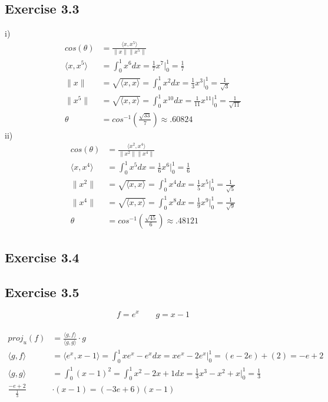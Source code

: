 \documentclass[letterpaper,12pt]{article}
\theoremstyle{definition}
\begin{document}
\subsection*{Exercise 3.3}
i)
\begin{align*}
cos(\theta)& = \frac{\langle x,x^{5}\rangle }{\|x\|\|x^{5}\|} \\
\langle x,x^{5}\rangle  &= \int^{1}_{0} x^{6} dx = \frac{1}{7}x^{7} |_{0}^{1} = \frac{1}{7} \\
\|x\| &= \sqrt{\langle x,x\rangle } = \int^{1}_{0} x^{2} dx = \frac{1}{3}x^{3} |_{0}^{1} = \frac{1}{\sqrt{3}} \\ 
\|x^{5}\| &= \sqrt{\langle x,x\rangle } = \int^{1}_{0} x^{10} dx = \frac{1}{11}x^{11} |_{0}^{1} = \frac{1}{\sqrt{11}} \\ 
\theta &= cos^{-1}(\frac{\sqrt{33}}{7}) \approx .60824
\end{align*}
ii)
\begin{align*}
cos(\theta)& = \frac{\langle x^{2},x^{4}\rangle }{\|x^{2}\|\|x^{4}\|} \\
\langle x,x^{4}\rangle  &= \int^{1}_{0} x^{5} dx = \frac{1}{6}x^{6} |_{0}^{1} = \frac{1}{6} \\
\|x^{2}\| &= \sqrt{\langle x,x\rangle } = \int^{1}_{0} x^{4} dx = \frac{1}{5}x^{5} |_{0}^{1} = \frac{1}{\sqrt{5}} \\ 
\|x^{4}\| &= \sqrt{\langle x,x\rangle } = \int^{1}_{0} x^{8} dx = \frac{1}{9}x^{9} |_{0}^{1} = \frac{1}{\sqrt{9}} \\ 
\theta &= cos^{-1}(\frac{\sqrt{45}}{6}) \approx .48121
\end{align*}

\subsection*{Exercise 3.4}


\subsection*{Exercise 3.5}
\[f = e^{x} ~~~~~~~~~ g = x-1 \] \\
\begin{align*}
proj_{u}(f) &= \frac{\langle g,f\rangle }{\langle g,g\rangle } \cdot g \\
\langle g,f\rangle  &= \langle e^{x}, x-1\rangle  = \int_{0}^{1}xe^{x} - e^{x} dx = xe^{x} - 2e^{x} |_{0}^{1} = (e-2e) + (2) = -e +2 \\ 
\langle g,g\rangle  &= \int_{0}^{1}(x-1)^{2} = \int_{0}^{1} x^{2} - 2x + 1 dx = \frac{1}{3}x^{3} - x^{2} + x |_{0}^{1} = \frac{1}{3} \\
\frac{-e+2}{\frac{1}{3}} &\cdot(x-1) = (-3e+6)(x-1)
\end{align*}
\end{document}
